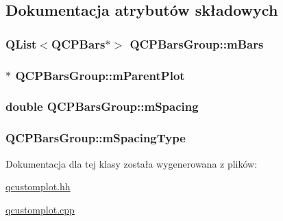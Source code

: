 \subsection{Dokumentacja atrybutów składowych}
\subsubsection[{\texorpdfstring{m\+Bars}{mBars}}]{\setlength{\rightskip}{0pt plus 5cm}Q\+List$<${\bf Q\+C\+P\+Bars}$\ast$$>$ Q\+C\+P\+Bars\+Group\+::m\+Bars\hspace{0.3cm}{\ttfamily [protected]}}\hypertarget{class_q_c_p_bars_group_affdb1e9233c277ff5a4c0a1121cf1fc0}{}\label{class_q_c_p_bars_group_affdb1e9233c277ff5a4c0a1121cf1fc0}
\subsubsection[{\texorpdfstring{m\+Parent\+Plot}{mParentPlot}}]{$\ast$ Q\+C\+P\+Bars\+Group\+::m\+Parent\+Plot\hspace{0.3cm}{\ttfamily [protected]}}\hypertarget{class_q_c_p_bars_group_a973d408cfbf88db95115aec71877f9e7}{}\label{class_q_c_p_bars_group_a973d408cfbf88db95115aec71877f9e7}
\subsubsection[{\texorpdfstring{m\+Spacing}{mSpacing}}]{\setlength{\rightskip}{0pt plus 5cm}double Q\+C\+P\+Bars\+Group\+::m\+Spacing\hspace{0.3cm}{\ttfamily [protected]}}\hypertarget{class_q_c_p_bars_group_a56471d7f548ca6141b7a5bf9629f7ece}{}\label{class_q_c_p_bars_group_a56471d7f548ca6141b7a5bf9629f7ece}
\subsubsection[{\texorpdfstring{m\+Spacing\+Type}{mSpacingType}}]{ Q\+C\+P\+Bars\+Group\+::m\+Spacing\+Type\hspace{0.3cm}{\ttfamily [protected]}}\hypertarget{class_q_c_p_bars_group_a6794ee1a9c81864d627bff6a4b2d64ec}{}\label{class_q_c_p_bars_group_a6794ee1a9c81864d627bff6a4b2d64ec}


Dokumentacja dla tej klasy została wygenerowana z plików\+:\begin{DoxyCompactItemize}
\item 
\hyperlink{qcustomplot_8hh}{qcustomplot.\+hh}\item 
\hyperlink{qcustomplot_8cpp}{qcustomplot.\+cpp}\end{DoxyCompactItemize}
